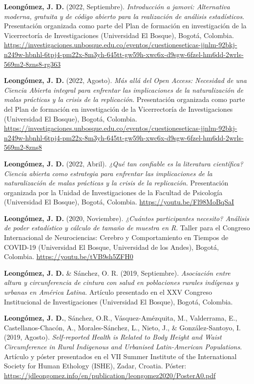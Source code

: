 \documentclass[11pt,a4paper,]{awesome-cv}
\begin{document}
\textbf{Leongómez, J. D.} (2022, Septiembre). \emph{Introducción a
jamovi: Alternativa moderna, gratuita y de código abierto para la
realización de análisis estadísticos}. Presentación organizada como
parte del Plan de formación en investigación de la Vicerrectoría de
Investigaciones (Universidad El Bosque), Bogotá, Colombia.
\url{https://investigaciones.unbosque.edu.co/eventos/cuestioneseticas-jjnlm-92bkj-n249w-hbnhl-6tpj4-pm22x-8m3yh-645tt-gw59h-xwc6x-d9sgw-6fzel-hm6dd-2wrls-569m2-8zns8-rg363}

\textbf{Leongómez, J. D.} (2022, Agosto). \emph{Más allá del Open
Access: Necesidad de una Ciencia Abierta integral para enfrentar las
implicaciones de la naturalización de malas prácticas y la crisis de la
replicación}. Presentación organizada como parte del Plan de formación
en investigación de la Vicerrectoría de Investigaciones (Universidad El
Bosque), Bogotá, Colombia.
\url{https://investigaciones.unbosque.edu.co/eventos/cuestioneseticas-jjnlm-92bkj-n249w-hbnhl-6tpj4-pm22x-8m3yh-645tt-gw59h-xwc6x-d9sgw-6fzel-hm6dd-2wrls-569m2-8zns8}

\textbf{Leongómez, J. D.} (2022, Abril). \emph{¿Qué tan confiable es la
literatura científica? Ciencia abierta como estrategia para enfrentar
las implicaciones de la naturalización de malas prácticas y la crisis de
la replicación}. Presentación organizada por la Unidad de
Investigaciones de la Facultad de Psicología (Universidad El Bosque),
Bogotá, Colombia. \url{https://youtu.be/Fl98MoBqSaI}

\textbf{Leongómez, J. D.} (2020, Noviembre). \emph{¿Cuántos
participantes necesito? Análisis de poder estadístico y cálculo de
tamaño de muestra en R}. Taller para el Congreso Internacional de
Neurociencias: Cerebro y Comportamiento en Tiempos de COVID-19
(Universidad El Bosque, Universidad de los Andes), Bogotá, Colombia.
\url{https://youtu.be/tVB9sh5ZFH0}

\textbf{Leongómez, J. D.} \& Sánchez, O. R. (2019, Septiembre).
\emph{Asociación entre altura y circunferencia de cintura con salud en
poblaciones rurales indígenas y urbanas en América Latina}. Artículo
presentado en el XXV Congreso Institucional de Investigaciones
(Universidad El Bosque), Bogotá, Colombia.

\textbf{Leongómez, J. D.}, Sánchez, O.R., Vásquez-Amézquita, M.,
Valderrama, E., Castellanos-Chacón, A., Morales-Sánchez, L., Nieto, J.,
\& González-Santoyo, I. (2019, Agosto). \emph{Self-reported Health is
Related to Body Height and Waist Circumference in Rural Indigenous and
Urbanised Latin-American Populations}. Artículo y póster presentados en
el VII Summer Institute of the International Society for Human Ethology
(ISHE), Zadar, Croatia. Póster:
\url{https://jdleongomez.info/en/publication/leongomez2020/PosterA0.pdf}
\end{document}
